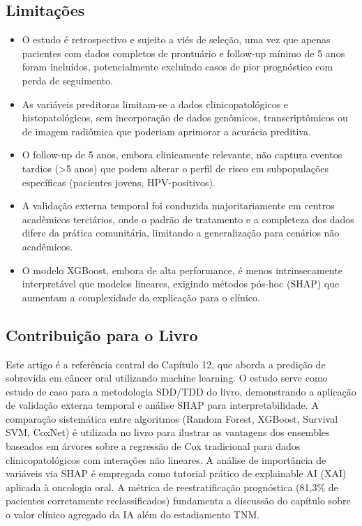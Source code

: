 \subsection{Limitações}
\begin{itemize}
  \item O estudo é retrospectivo e sujeito a viés de seleção, uma vez
        que apenas pacientes com dados completos de prontuário e
        follow-up mínimo de 5 anos foram incluídos, potencialmente
        excluindo casos de pior prognóstico com perda de seguimento.
  \item As variáveis preditoras limitam-se a dados clinicopatológicos
        e histopatológicos, sem incorporação de dados genômicos,
        transcriptômicos ou de imagem radiômica que poderiam aprimorar
        a acurácia preditiva.
  \item O follow-up de 5 anos, embora clinicamente relevante, não captura
        eventos tardios (>5 anos) que podem alterar o perfil de risco
        em subpopulações específicas (pacientes jovens, HPV-positivos).
  \item A validação externa temporal foi conduzida majoritariamente em
        centros acadêmicos terciários, onde o padrão de tratamento e a
        completeza dos dados difere da prática comunitária, limitando
        a generalização para cenários não acadêmicos.
  \item O modelo XGBoost, embora de alta performance, é menos
        intrinsecamente interpretável que modelos lineares, exigindo
        métodos pós-hoc (SHAP) que aumentam a complexidade da
        explicação para o clínico.
\end{itemize}

\subsection{Contribuição para o Livro}
Este artigo é a referência central do Capítulo 12, que aborda a predição
de sobrevida em câncer oral utilizando machine learning. O estudo serve
como estudo de caso para a metodologia SDD/TDD do livro, demonstrando a
aplicação de validação externa temporal e análise SHAP para
interpretabilidade. A comparação sistemática entre algoritmos (Random
Forest, XGBoost, Survival SVM, CoxNet) é utilizada no livro para
ilustrar as vantagens dos ensembles baseados em árvores sobre a
regressão de Cox tradicional para dados clinicopatológicos com
interações não lineares. A análise de importância de variáveis via SHAP
é empregada como tutorial prático de explainable AI (XAI) aplicada à
oncologia oral. A métrica de reestratificação prognóstica (81,3\% de
pacientes corretamente reclassificados) fundamenta a discussão do
capítulo sobre o valor clínico agregado da IA além do estadiamento TNM.

